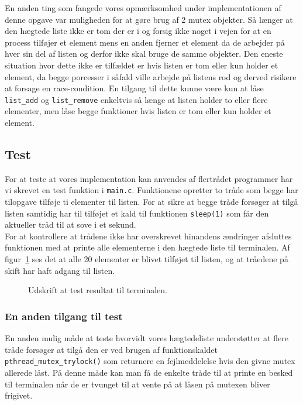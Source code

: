\documentclass[main.tex]{subfile}
\begin{document}
En anden ting som fangede vores opmærksomhed under implementationen af denne opgave var muligheden for at gøre brug af 2 mutex objekter. Så længer at den hægtede liste ikke er tom der er i og forsig ikke noget i vejen for at en process tilføjer et element mens en anden fjerner et element da de arbejder på hver sin del af listen og derfor ikke skal bruge de samme objekter. Den eneste situation hvor dette ikke er tilfældet er hvis listen er tom eller kun holder et element, da begge porcesser i såfald ville arbejde på listens rod og derved risikere at forsage en race-condition. En tilgang til dette kunne være kun at låse \texttt{list\_add} og \texttt{list\_remove} enkeltvis så længe at listen holder to eller flere elementer, men låse begge funktioner hvis listen er tom eller kun holder et element.

\subsection{Test}\label{sec:del2_test}
For at teste at vores implementation kan anvendes af flertrådet programmer har vi skrevet en test funktion i \texttt{main.c}. Funktionene opretter to tråde som begge har tilopgave tilføje ti elementer til listen. For at sikre at begge tråde forsøger at tilgå listen samtidig har til tilføjet et kald til funktionen \texttt{sleep(1)} som får den aktueller tråd til at sove i et sekund.\\

For at kontrollere at trådene ikke har overskrevet hinandens ændringer afsluttes funktionen med at printe alle elementerne i den hægtede liste til terminalen. Af figur~\ref{fig:opg2_2_test} ses det at alle 20 elementer er blivet tilføjet til listen, og at tråedene på skift har haft adgang til listen. 

\begin{figure}[H]
\center
{}
\caption{Udskrift at test resultat til terminalen.}
\label{fig:opg2_2_test}
\end{figure}

\subsubsection{En anden tilgang til test}
En anden mulig måde at teste hvorvidt vores hægtedeliste understøtter at flere tråde forsøger at tilgå den er ved brugen af funktionskaldet \texttt{pthread\_mutex\_trylock()} som returnere en fejlmeddelelse hvis den givne mutex allerede låst. På denne måde kan man få de enkelte tråde til at printe en besked til terminalen når de er tvunget til at vente på at låsen på mutexen bliver frigivet. 
\end{document}
